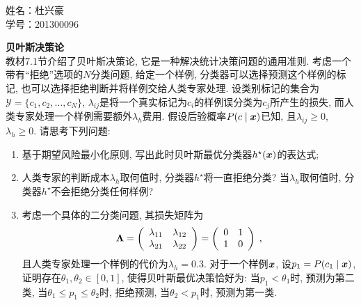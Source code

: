 \documentclass[answers]{exam}  %
\begin{document}
\noindent 
姓名：杜兴豪 \\
学号：201300096 \\
\begin{questions}
\question [20] \textbf{贝叶斯决策论} \\
教材7.1节介绍了贝叶斯决策论, 它是一种解决统计决策问题的通用准则. 考虑一个带有“拒绝”选项的$N$分类问题, 给定一个样例, 分类器可以选择预测这个样例的标记, 也可以选择拒绝判断并将样例交给人类专家处理. 设类别标记的集合为$\mathcal{Y}=\{c_1,c_2,\ldots,c_N\}$, $\lambda_{ij}$是将一个真实标记为$c_i$的样例误分类为$c_j$所产生的损失, 而人类专家处理一个样例需要额外$\lambda_{h}$费用. 假设后验概率$P(c\mid{\boldsymbol{x}})$已知, 且$\lambda_{ij}\geq 0$, $\lambda_{h}\geq 0$. 请思考下列问题:
\begin{enumerate}
	\item 基于期望风险最小化原则, 写出此时贝叶斯最优分类器$h^\star({\boldsymbol{x}})$的表达式;
	\item 人类专家的判断成本$\lambda_{h}$取何值时, 分类器$h^\star$将一直拒绝分类? 当$\lambda_{h}$取何值时, 分类器$h^\star$不会拒绝分类任何样例?
	\item 考虑一个具体的二分类问题, 其损失矩阵为
	\begin{equation}
		\boldsymbol{\Lambda}=\left(\begin{array}{cc}
			\lambda_{11} & \lambda_{12} \\
			\lambda_{21} & \lambda_{22} \end{array}\right)=\left(\begin{array}{cc}
			0 & 1 \\
			1 & 0 \end{array}\right)\;,
	\label{ch7_eq:cost_matrix}
	\end{equation}
	且人类专家处理一个样例的代价为$\lambda_{h}=0.3$. 对于一个样例${\boldsymbol{x}}$, 设$p_1=P(c_1\mid{\boldsymbol{x}})$, 证明存在$\theta_1,\theta_2\in[0,1]$, 使得贝叶斯最优决策恰好为: 当$p_1<\theta_1$时, 预测为第二类, 当$\theta_1\leq p_1\leq \theta_2$时, 拒绝预测, 当$\theta_2<p_1$时, 预测为第一类.
\end{enumerate}


\end{questions}
\end{document}

